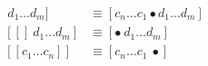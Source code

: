 \documentclass[10pt]{article}
\begin{document}
\begin{align*}[[c_1 \ldots c_n]~ d_1 \ldots d_m] &\equiv [c_n \ldots c_1 \bullet d_1 \ldots d_m]\\
[[]~ d_1 \ldots d_m] &\equiv [\bullet~ d_1 \ldots d_m] \\
[[c_1 \ldots c_n]] &\equiv [c_n \ldots c_1~\bullet] 

\end{align*}
\end{document}
